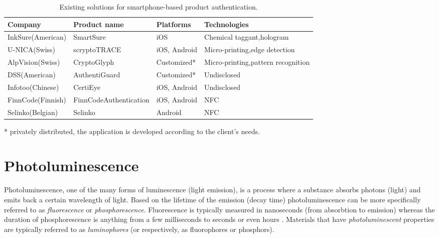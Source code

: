 \documentclass[thesis.tex]{subfiles}
\begin{document}
\begin{table}[ht]
	\caption{Existing solutions for smartphone-based product authentication.} \label{table:existing-solutions}

	\begin{center}
	\begin{tabular}{| m{2cm} | m{3.25cm} | m{3cm} | m{3.75cm} |}

		\hline
		\textbf{Company}				&	\textbf{Product name}			&	\textbf{Platforms}			&	\textbf{Technologies} \\ \hline
		InkSure\newline (American)		&	SmartSure						&	iOS							&	Chemical taggant,\newline hologram \\ \hline
		U-NICA\newline (Swiss)			&	scryptoTRACE\textregistered		&	iOS, Android				&	Micro-printing,\newline edge detection \\ \hline
		AlpVision\newline (Swiss)		&	CryptoGlyph\textregistered		&	Customized\footnotesize{*}	&	Micro-printing,\newline pattern recognition \\ \hline
		DSS\newline (American)			&	AuthentiGuard					&	Customized\footnotesize{*}	&	Undisclosed \\ \hline
		Infotoo\newline (Chinese)		&	CertiEye						&	iOS, Android				&	Undisclosed \\ \hline
		FinnCode\newline (Finnish)		&	FinnCode\newline Authentication			&	iOS, Android				&	NFC \\ \hline
		Selinko\newline (Belgian)		&	Selinko							&	Android						&	NFC \\
		\hline
	\end{tabular}
	\end{center}
	\scriptsize{*} \small{privately distributed, the application is developed according to the client's needs.}
\end{table}

\section{Photoluminescence}
\label{section:photoluminescence}

Photoluminescence, one of the many forms of luminescence (light emission), is a process where a substance absorbs photons (light) and emits back a certain wavelength of light. Based on the lifetime of the emission (decay time) photoluminescence can be more specifically referred to as \emph{fluorescence} or \emph{phosphorescence}. Fluorescence is typically measured in nanoseconds (from absorbtion to emission) whereas the duration of phosphorescence is anything from a few milliseconds to seconds or even hours \cite{luminescence_basics}. Materials that have \emph{photoluminescent} properties are typically referred to as \emph{luminophores} (or respectively, as fluorophores or phosphors).
\end{document}
